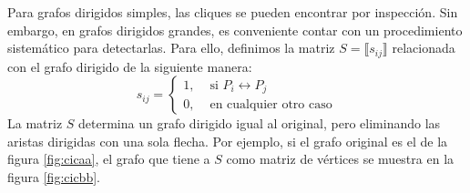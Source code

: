 Para grafos dirigidos simples, las cliques se pueden encontrar por inspección. Sin embargo, en grafos dirigidos grandes, es conveniente contar con un procedimiento sistemático para detectarlas. Para ello, definimos la matriz $S = \lBrack s_{ij} \rBrack$ relacionada con el grafo dirigido de la siguiente manera:
$$s_{ij} = \begin{cases}
    1, & \text{ si } P_i \leftrightarrow P_j \\
    0, & \text{ en cualquier otro caso}
\end{cases}$$
La matriz $S$ determina un grafo dirigido igual al original, pero eliminando las aristas dirigidas con una sola flecha. Por ejemplo, si el grafo original es el de la figura \ref{fig:cicaa}, el grafo que tiene a $S$ como matriz de vértices se muestra en la figura \ref{fig:cicbb}.
\begin{figure}[h!]
    \centering
     \hfill
    \caption{}
\end{figure}


